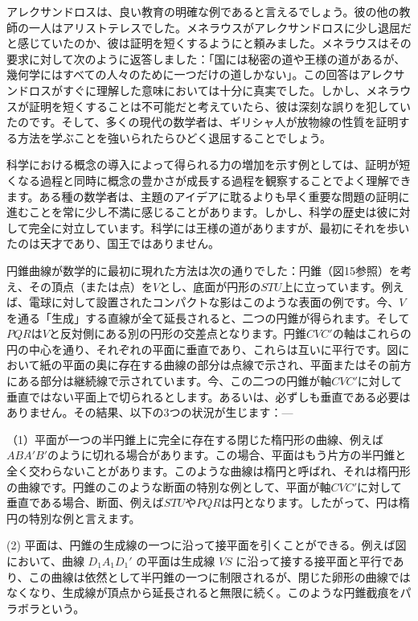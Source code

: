 \documentclass[a4paper,11pt,openany]{ltjsbook}
\begin{document}
アレクサンドロスは、良い教育の明確な例であると言えるでしょう。彼の他の教師の一人はアリストテレスでした。メネラウスがアレクサンドロスに少し退屈だと感じていたのか、彼は証明を短くするようにと頼みました。メネラウスはその要求に対して次のように返答しました：「国には秘密の道や王様の道があるが、幾何学にはすべての人々のために一つだけの道しかない」。この回答はアレクサンドロスがすぐに理解した意味においては十分に真実でした。しかし、メネラウスが証明を短くすることは不可能だと考えていたら、彼は深刻な誤りを犯していたのです。そして、多くの現代の数学者は、ギリシャ人が放物線の性質を証明する方法を学ぶことを強いられたらひどく退屈することでしょう。

科学における概念の導入によって得られる力の増加を示す例としては、証明が短くなる過程と同時に概念の豊かさが成長する過程を観察することでよく理解できます。ある種の数学者は、主題のアイデアに耽るよりも早く重要な問題の証明に進むことを常に少し不満に感じることがあります。しかし、科学の歴史は彼に対して完全に対立しています。科学には王様の道がありますが、最初にそれを歩いたのは天才であり、国王ではありません。

円錐曲線が数学的に最初に現れた方法は次の通りでした：円錐（図15参照）を考え、その頂点（または点）を$V$とし、底面が円形の$STU$上に立っています。例えば、電球に対して設置されたコンパクトな影はこのような表面の例です。今、$V$を通る「生成」する直線が全て延長されると、二つの円錐が得られます。そして$PQR$は$V$と反対側にある別の円形の交差点となります。円錐$CVC'$の軸はこれらの円の中心を通り、それぞれの平面に垂直であり、これらは互いに平行です。図において紙の平面の奥に存在する曲線の部分は点線で示され、平面またはその前方にある部分は継続線で示されています。今、この二つの円錐が軸$CVC'$に対して垂直ではない平面上で切られるとします。あるいは、必ずしも垂直である必要はありません。その結果、以下の3つの状況が生じます：---

（1）平面が一つの半円錐上に完全に存在する閉じた楕円形の曲線、例えば$ABA'B'$のように切れる場合があります。この場合、平面はもう片方の半円錐と全く交わらないことがあります。このような曲線は楕円と呼ばれ、それは楕円形の曲線です。円錐のこのような断面の特別な例として、平面が軸$CVC'$に対して垂直である場合、断面、例えば$STU$や$PQR$は円となります。したがって、円は楕円の特別な例と言えます。

(2) 平面は、円錐の生成線の一つに沿って接平面を引くことができる。例えば図において、曲線 $D_{1}A_{1}D_{1}'$ の平面は生成線 $VS$ に沿って接する接平面と平行であり、この曲線は依然として半円錐の一つに制限されるが、閉じた卵形の曲線ではなくなり、生成線が頂点から延長されると無限に続く。このような円錐截痕をパラボラという。
\end{document}
